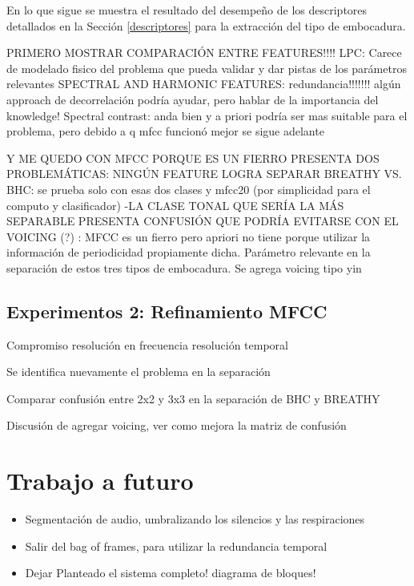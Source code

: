 \documentclass{article}
\begin{document}
En lo que sigue se muestra el resultado del desempeño de los descriptores detallados en la Sección \ref{descriptores} para la extracción del tipo de embocadura.

PRIMERO MOSTRAR COMPARACIÓN ENTRE FEATURES!!!!
LPC: Carece de modelado fisico del problema que pueda validar y dar pistas de los parámetros relevantes
SPECTRAL AND HARMONIC FEATURES: redundancia!!!!!!! algún approach de decorrelación podría ayudar, pero hablar de la importancia del knowledge!
Spectral contrast: anda bien y a priori podría ser mas suitable para el problema, pero debido a q mfcc funcionó mejor se sigue adelante

Y ME QUEDO CON MFCC PORQUE ES UN FIERRO
PRESENTA DOS PROBLEMÁTICAS: 
NINGÚN FEATURE LOGRA SEPARAR BREATHY VS. BHC: se prueba solo con esas dos clases y mfcc20 (por simplicidad para el computo y clasificador) 
-LA CLASE TONAL QUE SERÍA LA MÁS SEPARABLE PRESENTA CONFUSIÓN QUE PODRÍA EVITARSE CON EL VOICING (?) : MFCC es un fierro pero apriori no tiene porque utilizar la información de periodicidad propiamente dicha. Parámetro relevante en la separación de estos tres tipos de embocadura. Se agrega voicing tipo yin \cite{de2002yin}
 
\subsection{Experimentos 2: Refinamiento MFCC}
Compromiso resolución en frecuencia resolución temporal




Se identifica nuevamente el problema en la separación

Comparar confusión entre 2x2 y 3x3 en la separación de BHC y BREATHY

Discusión de agregar voicing, ver como mejora la matriz de confusión 

\subsubsection{}


\section{Trabajo a futuro}

\begin{itemize} 
  \item Segmentación de audio, umbralizando los silencios y las respiraciones 
  \item Salir del bag of frames, para utilizar la redundancia temporal
  \item Dejar Planteado el sistema completo! diagrama de bloques!
\end{itemize}


\newpage




\end{document}
